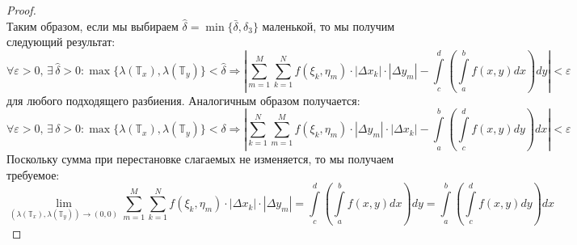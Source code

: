 \documentclass[12pt]{article}
\newcommand{\MTB}{\mathbb{T}}
\newcommand{\VE}{\varepsilon}
\theoremstyle{definition}
\newcommand{\ddsum}[2]{\displaystyle\sum\limits_{#1}^{#2}}
\newcommand{\ddint}[2]{\displaystyle\int\limits_{#1}^{#2}}
\begin{document}
\begin{proof}
$$	$$
	Таким образом, если мы выбираем $\hat{\delta} = \min\{\bar{\delta}, \delta_3\}$ маленькой, то мы получим следующий результат:
	$$
		\forall \VE > 0, \, \exists \, \hat{\delta} > 0 \colon \max\{\lambda(\MTB_x), \lambda(\MTB_y)\} < \hat{\delta} \Rightarrow \left|\ddsum{m = 1}{M}\ddsum{k = 1}{N}f(\xi_k,\eta_m){\cdot}|\Delta x_k|{\cdot}|\Delta y_m| - \ddint{c}{d}\left(\ddint{a}{b}f(x,y)dx\right)dy \right| < \VE
	$$
	для любого подходящего разбиения. Аналогичным образом получается:
	$$
		\forall \VE > 0, \, \exists \, \delta > 0 \colon \max\{\lambda(\MTB_x), \lambda(\MTB_y)\} < \delta \Rightarrow \left|\ddsum{k = 1}{N}\ddsum{m = 1}{M}f(\xi_k,\eta_m){\cdot}|\Delta y_m|{\cdot}|\Delta x_k| - \ddint{a}{b}\left(\ddint{c}{d}f(x,y)dy\right)dx \right| < \VE
	$$
	Поскольку сумма при перестановке слагаемых не изменяется, то мы получаем требуемое:
	$$
		\lim\limits_{(\lambda(\MTB_x),\lambda(\MTB_y)) \to (0,0)}\ddsum{m = 1}{M}\ddsum{k = 1}{N}f(\xi_k,\eta_m){\cdot}|\Delta x_k|{\cdot}|\Delta y_m| = \ddint{c}{d}\left(\ddint{a}{b}f(x,y)dx\right)dy = \ddint{a}{b}\left(\ddint{c}{d}f(x,y)dy\right)dx
	$$
\end{proof}
\end{document}
